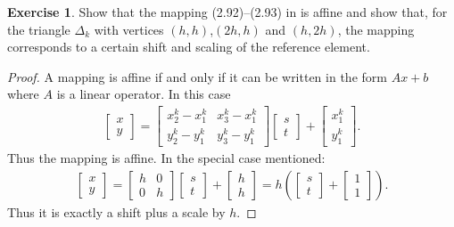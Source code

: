 \documentclass{amsart}
\theoremstyle{plain}
\theoremstyle{definition}
\newtheorem{exer}{Exercise}[section]
\begin{document}
\begin{exer}
    Show that the mapping (2.92)–(2.93) in \cite{lord2014introduction} is affine and show that, for the triangle $\Delta_k$ with vertices $(h,h)$,$(2h,h)$ and $(h,2h)$, the mapping corresponds to a certain shift and scaling of the reference element.
\end{exer}
\begin{proof}
    A mapping is affine if and only if it can be written in the form $Ax+b$ where $A$ is a linear operator. In this case 
    \begin{gather}
        \begin{bmatrix}
            x\\y
        \end{bmatrix}=\begin{bmatrix}
            x_2^k-x_1^k & x_3^k-x_1^k\\
            y_2^k-y_1^k & y_3^k-y_1^k
        \end{bmatrix}\begin{bmatrix}
            s\\t
        \end{bmatrix}+\begin{bmatrix}
            x_1^k\\y_1^k
        \end{bmatrix}.
    \end{gather}
    Thus the mapping is affine. In the special case mentioned:
    \begin{gather}
        \begin{bmatrix}
            x\\y
        \end{bmatrix}=\begin{bmatrix}
            h & 0\\
            0 & h
        \end{bmatrix}\begin{bmatrix}
            s\\t
        \end{bmatrix}+\begin{bmatrix}
            h\\h
        \end{bmatrix} = h\left(\begin{bmatrix}
            s\\t
        \end{bmatrix}+\begin{bmatrix}
            1\\1
        \end{bmatrix}\right).
    \end{gather}
    Thus it is exactly a shift plus a scale by $h$.
\end{proof}
\end{document}
